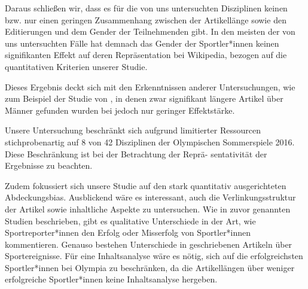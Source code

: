 \documentclass[11pt]{article}
\begin{document}
Daraus schließen wir, dass es für die von uns untersuchten Disziplinen keinen bzw. nur einen geringen Zusammenhang zwischen der Artikellänge sowie den Editierungen und dem Gender der Teilnehmenden gibt. In den meisten der von uns untersuchten Fälle hat demnach das Gender der Sportler*innen keinen signifikanten Effekt auf deren Repräsentation bei Wikipedia, bezogen auf die quantitativen Kriterien unserer Studie.

Dieses Ergebnis deckt sich mit den Erkenntnissen anderer Untersuchungen, wie zum Beispiel der Studie von \textcite{GraellsGarrido2015}, in denen zwar signifikant längere Artikel über Männer gefunden wurden bei jedoch nur geringer Effektstärke.

Unsere Untersuchung beschränkt sich aufgrund limitierter Ressourcen stichprobenartig auf 8 von 42 Disziplinen der Olympischen Sommerspiele 2016. Diese Beschränkung ist bei der Betrachtung der Reprä- sentativität der Ergebnisse zu beachten.

Zudem fokussiert sich unsere Studie auf den stark quantitativ ausgerichteten Abdeckungsbias. Ausblickend wäre es interessant, auch die Verlinkungsstruktur der Artikel sowie inhaltliche Aspekte zu untersuchen. Wie in zuvor genannten Studien beschrieben, gibt es qualitative Unterschiede in der Art, wie Sportreporter*innen den Erfolg oder Misserfolg von Sportler*innen kommentieren. Genauso bestehen Unterschiede in geschriebenen Artikeln über Sportereignisse. Für eine Inhaltsanalyse wäre es nötig, sich auf die erfolgreichsten Sportler*innen bei Olympia zu beschränken, da die Artikellängen über weniger erfolgreiche Sportler*innen keine Inhaltsanalyse hergeben.

\printbibliography
\end{document}
